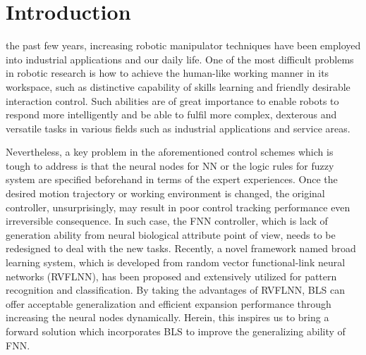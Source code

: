 \documentclass[journal]{IEEEtran}
\begin{document}
\begin{IEEEkeywords}

\end{IEEEkeywords}

\section{Introduction}
 the past few years, increasing robotic manipulator techniques have been employed into industrial applications and our daily life. One of the most difficult problems in robotic research is how to achieve the human-like working manner in its workspace, such as distinctive capability of skills learning and friendly desirable interaction control. Such abilities are of great importance to enable robots to respond more intelligently and be able to fulfil more complex, dexterous and versatile tasks in various fields such as industrial applications and service areas. 

Nevertheless, a key problem in the aforementioned control schemes which is tough to address is that the neural nodes for NN or the logic rules for fuzzy system are specified beforehand in terms of the expert experiences. Once the desired motion trajectory or working environment is changed, the original controller, unsurprisingly, may result in poor control tracking performance even irreversible consequence. In such case, the FNN controller, which is lack of generation ability from neural biological attribute point of view, needs to be redesigned to deal with the new tasks. Recently, a novel framework named broad learning system, which is developed from random vector functional-link neural networks (RVFLNN), has been proposed and extensively utilized for pattern recognition and classification. By taking the advantages of RVFLNN, BLS can offer acceptable generalization and efficient expansion performance through increasing the neural nodes dynamically. Herein, this inspires us to bring a forward solution which incorporates BLS to improve the generalizing ability of FNN.
\end{document}
